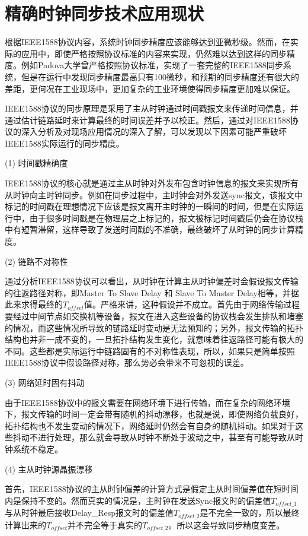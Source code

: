 \section{精确时钟同步技术应用现状}
根据IEEE1588协议内容，系统时钟同步精度应该能够达到亚微秒级\supercite{2}。然而，在实际的应用中，即使严格按照协议标准的内容来实现，仍然难以达到这样的同步精度。例如Padova大学曾严格按照协议标准，实现了一套完整的IEEE1588同步系统\supercite{3}，但是在运行中发现同步精度最高只有100微秒，和预期的同步精度还有很大的差距，更何况在工业现场中，更加复杂的工业环境使得同步精度更加难以保证。

IEEE1588协议的同步原理是采用了主从时钟通过时间戳报文来传递时间信息，并通过估计链路延时来计算最终的时间误差并予以校正。然后，通过对IEEE1588协议的深入分析及对现场应用情况的深入了解，可以发现以下因素可能严重破坏IEEE1588实际运行的同步精度。

(1) 时间戳精确度

IEEE1588协议的核心就是通过主从时钟对外发布包含时钟信息的报文来实现所有从时钟向主时钟同步。例如在同步过程中，主时钟会对外发送sync报文，该报文中标记的时间戳在理想情况下应该是报文离开主时钟的一瞬间的时间，但是在实际运行中，由于很多时间戳是在物理层之上标记的，报文被标记时间戳后仍会在协议栈中有短暂滞留，这样导致了发送时间戳的不准确，最终破坏了从时钟的同步计算精度\supercite{25}。

(2) 链路不对称性

通过分析IEEE1588协议可以看出，从时钟在计算主从时钟偏差时会假设报文传输的往返路径对称，即Master To Slave Delay 和 Slave To Master Delay相等，并据此来求得最终的$T_{offset}$值。严格来讲，这种假设并不成立。首先由于网络传输过程要经过中间节点如交换机等设备，报文在进入这些设备的协议栈会发生排队和堵塞的情况，而这些情况所导致的链路延时变动是无法预知的；另外，报文传输的拓扑结构也并非一成不变的，一旦拓扑结构发生变化，就意味着往返路径可能有极大的不同。这些都是实际运行中链路固有的不对称性表现\supercite{34}，所以，如果只是简单按照IEEE1588协议中假设路径对称，那么势必会带来不可忽视的误差。

(3) 网络延时固有抖动

由于IEEE1588协议中的报文需要在网络环境下进行传输，而在复杂的网络环境下，报文传输的时间一定会带有随机的抖动漂移，也就是说，即使网络负载良好，拓扑结构也不发生变动的情况下，网络延时仍然会有自身的随机抖动。如果对于这些抖动不进行处理，那么就会导致从时钟不断处于波动之中，甚至有可能导致从时钟系统不稳定。

(4) 主从时钟源晶振漂移

首先，IEEE1588协议的主从时钟偏差的计算方式是假定主从时间偏差值在短时间内是保持不变的。然而真实的情况是，主时钟在发送Sync报文时的偏差值$T_{offset\_1}$与从时钟最后接收Delay\_Resp报文时的偏差值$T_{offset\_2}$是不完全一致的，所以最终计算出来的$T_{offset}$并不完全等于真实的$T_{offset\_2}$\supercite{4}。所以这会导致同步精度变差。

